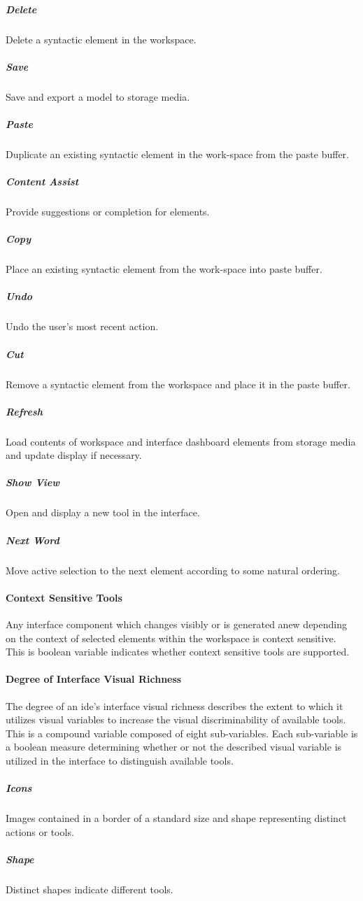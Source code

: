\subparagraph{Delete} Delete a syntactic element in the workspace.

\subparagraph{Save} Save and export a model to storage media.

\subparagraph{Paste} Duplicate an existing syntactic element in the
work{-}space from the paste buffer.

\subparagraph{Content Assist} Provide suggestions or completion for
elements.

\subparagraph{Copy} Place an existing syntactic element from the
work{-}space into paste buffer.

\subparagraph{Undo} Undo the user's most recent action.

\subparagraph{Cut} Remove a syntactic element from the workspace and place
it in the paste buffer.

\subparagraph{Refresh} Load contents of workspace and interface dashboard
elements from storage media and update display if necessary.

\subparagraph{Show View} Open and display a new tool in the interface.

\subparagraph{Next Word} Move active selection to the next element
according to some natural ordering.


\paragraph{Context Sensitive Tools} Any interface component which changes
visibly or is generated anew depending on the context of selected elements
within the workspace is context sensitive. This is boolean variable
indicates whether context sensitive tools are supported.


\paragraph{Degree of Interface Visual Richness} The degree of an \ac{ide}'s
interface visual richness describes the extent to which it utilizes visual
variables to increase the visual discriminability of available tools. This
is a compound variable composed of eight sub-variables. Each sub-variable
is a boolean measure determining whether or not the described visual
variable is utilized in the interface to distinguish available tools.

\subparagraph{Icons} Images contained in a border of a standard size and
shape representing distinct actions or tools.
\cite{costagliola2002,moody2009}

\subparagraph{Shape} Distinct shapes indicate different tools.
\cite{moody2009}

